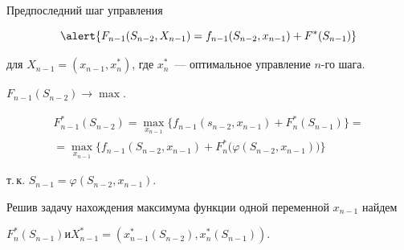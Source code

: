 \documentclass[unicode,11pt,notheorems,xcolor=table]{beamer}
\begin{document}
\begin{frame}{Предпоследний шаг управления}

$$
	\alert{F_{n-1}(S_{n-2},X_{n-1})=f_{n-1}(S_{n-2},x_{n-1})+F^*(S_{n-1})}
$$

для $X_{n-1}=(x_{n-1},x_n^*)$, где $x_n^*$~--- оптимальное управление $n$-го шага.  

 $F_{n-1}(S_{n-2})\to \max$.



\begin{multline*}
	F_{n-1}^*(S_{n-2}) 
	= \max_{x_{n-1}} \{f_{n-1}(s_{n-2},x_{n-1})+ F_n^*(S_{n-1})\}
	=\\
	= \max_{x_{n-1}} \Big\{f_{n-1}(S_{n-2},x_{n-1})+ F_n^*\big(\varphi (S_{n-2},x_{n-1})\big)\Big\}
\end{multline*}

т.\,к.  $S_{n-1}=\varphi (S_{n-2},x_{n-1})$.

\begin{block}{}
Решив задачу нахождения максимума функции одной переменной $x_{n-1}$ 
найдем 

{\centering $F_n^*\left(S_{n-1}\right)$\quad и\quad $X_{n-1}^*=(x_{n-1}^*(S_{n-2}),x_n^*(S_{n-1}))$.\par}
\end{block}

\end{frame}
\end{document}
